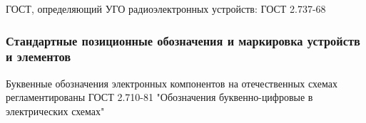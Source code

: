 \documentclass{article}
\begin{document}
\begin{flushleft}
ГОСТ, определяющий УГО радиоэлектронных устройств: ГОСТ 2.737-68

\subsubsection{Стандартные позиционные обозначения и маркировка устройств и элементов}

Буквенные обозначения электронных компонентов на отечественных схемах регламентированы ГОСТ 2.710-81 "Обозначения буквенно-цифровые в электрических схемах"

\end{flushleft}
\end{document}
